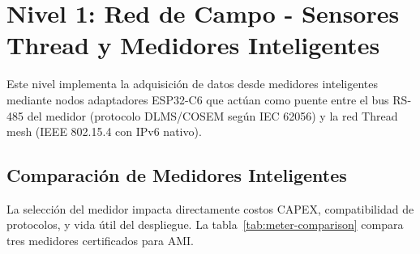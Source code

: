 \section{Nivel 1: Red de Campo - Sensores Thread y Medidores Inteligentes}
\label{sec:nivel1}

Este nivel implementa la adquisición de datos desde medidores inteligentes mediante nodos adaptadores ESP32-C6 que actúan como puente entre el bus RS-485 del medidor (protocolo DLMS/COSEM según IEC 62056) y la red Thread mesh (IEEE 802.15.4 con IPv6 nativo).

\subsection{Comparación de Medidores Inteligentes}

La selección del medidor impacta directamente costos CAPEX, compatibilidad de protocolos, y vida útil del despliegue. La tabla~\ref{tab:meter-comparison} compara tres medidores certificados para AMI.

\begin{table}[H]
\centering
\caption{Comparación técnica de medidores inteligentes certificados AMI para residencial monofásico 120V}
\label{tab:meter-comparison}
\end{table}

